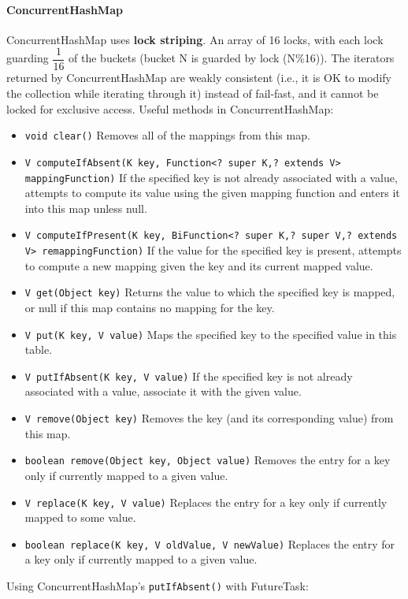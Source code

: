 \documentclass{article}
\begin{document}
\paragraph{ConcurrentHashMap} ConcurrentHashMap uses \textbf{lock striping}. An array of 16 locks, with each lock guarding $\dfrac{1}{16}$ of the buckets (bucket N is guarded by lock (N\%16)). The iterators returned by ConcurrentHashMap are weakly consistent (i.e., it is OK to modify the collection while iterating through it) instead of fail-fast, and it cannot be locked for exclusive access. Useful methods in ConcurrentHashMap:
\begin{itemize}
    \item \lstinline{void clear()} Removes all of the mappings from this map.
    \item \lstinline{V computeIfAbsent(K key, Function<? super K,? extends V> mappingFunction)} If the specified key is not already associated with a value, attempts to compute its value using the given mapping function and enters it into this map unless null.
    \item \lstinline{V computeIfPresent(K key, BiFunction<? super K,? super V,? extends V> remappingFunction)} If the value for the specified key is present, attempts to compute a new mapping given the key and its current mapped value.
    \item \lstinline{V get(Object key)} Returns the value to which the specified key is mapped, or null if this map contains no mapping for the key.
    \item \lstinline{V put(K key, V value)} Maps the specified key to the specified value in this table.
    \item \lstinline{V putIfAbsent(K key, V value)} If the specified key is not already associated with a value, associate it with the given value.
    \item \lstinline{V remove(Object key)} Removes the key (and its corresponding value) from this map.
    \item \lstinline{boolean remove(Object key, Object value)} Removes the entry for a key only if currently mapped to a given value.
    \item \lstinline{V replace(K key, V value)} Replaces the entry for a key only if currently mapped to some value.
    \item \lstinline{boolean replace(K key, V oldValue, V newValue)} Replaces the entry for a key only if currently mapped to a given value.
\end{itemize}
Using ConcurrentHashMap's \lstinline{putIfAbsent()} with FutureTask:\\
\end{document}
